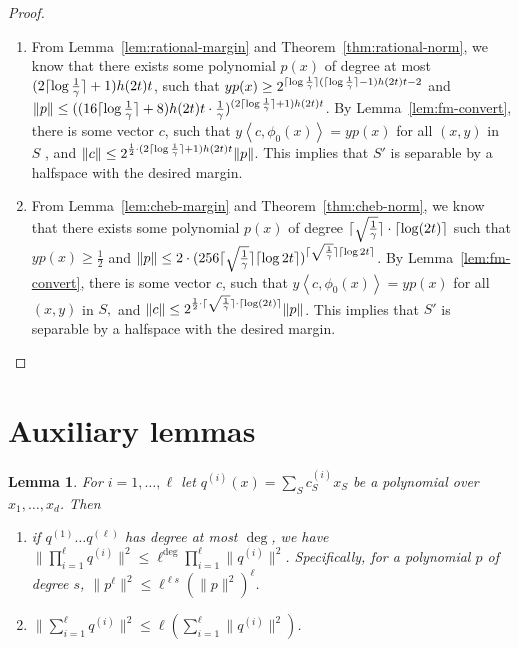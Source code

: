 \documentclass{article}
\DeclarePairedDelimiter\ceil{\lceil}{\rceil}
\newcommand{\inner}[1]{ \left\langle {#1} \right\rangle }
\newtheorem{lemma}[theorem]{Lemma}
\begin{document}
\begin{proof}
\begin{enumerate}
\item From Lemma~\ref{lem:rational-margin} and Theorem~\ref{thm:rational-norm}, 
we know that there exists some polynomial $p(x)$ of degree at most $(2\ceil{\log \frac 1 \gamma}+1) h(2t) t$, such that
$y p(x) \geq  2^{\ceil{\log \frac 1 \gamma}(\ceil{\log \frac 1 \gamma}-1)h(2t)t - 2}$ and 
$\|p\| \leq ((16\ceil{\log \frac 1 \gamma}+8) h(2t) t \cdot \frac 1 \gamma)^{(2\ceil{\log \frac 1 \gamma}+1)h(2t)t}$. 
By Lemma~\ref{lem:fm-convert}, there is some vector $c$, such that $y \inner{c, \phi_0(x)} = y p(x)$ for all $(x,y)$ in $S$	, and $\| c \| \leq 2^{\frac 1 2 \cdot (2\ceil{\log \frac 1 \gamma}+1) h(2t) t} \| p \|$.
This implies that $S'$ is separable by a halfspace with the desired margin.

\item From Lemma~\ref{lem:cheb-margin} and Theorem~\ref{thm:cheb-norm}, we know that there exists some polynomial $p(x)$ of degree $\ceil{\sqrt{\frac1\gamma}} \cdot \ceil{\log(2t)}$ such that
$y p(x) \geq \frac 1 2$ and
$\| p \| \leq 2 \cdot (256 \ceil{\sqrt{\frac1\gamma}} \ceil{\log 2t})^{\ceil{\sqrt{\frac1\gamma}} \ceil{\log 2t}}$. 
By Lemma~\ref{lem:fm-convert}, there is some vector $c$, such that $y \inner{c, \phi_0(x)} = y p(x)$ for all $(x,y)$ in $S,$ and $\| c \| \leq 2^{\frac 1 2 \cdot \ceil{\sqrt{\frac1\gamma}} \cdot \ceil{\log(2t)}} \| p \|$.	
This implies that $S'$ is separable by a halfspace with the desired margin.
\end{enumerate}


\end{proof}




\section{Auxiliary lemmas}
\begin{lemma}
   For $i=1,\ldots, \ell$ let $q^{(i)}(x)=\sum_S c^{(i)}_{S} x_S $ be a polynomial over $x_1, \ldots, x_d$. Then
   \begin{enumerate}
     \item if $q^{(1)}\ldots q^{(\ell)}$ has degree at most $\deg$, we have $\|\prod_{i=1}^{\ell} q^{(i)}\|^2 \leq \ell^{\deg} \prod_{i=1}^{\ell} \|q^{(i)}\|^2$. Specifically, for a polynomial $p$ of degree $s$, $\|p^\ell \|^2 \leq  \ell^{\ell s} (\|p\|^2)^\ell$.
     \item $\|\sum_{i=1}^{\ell} q^{(i)}\|^2 \leq \ell(\sum_{i=1}^{\ell} \|q^{(i)}\|^2)$.
   \end{enumerate}
   \label{lem:norm-oper}
\end{lemma}



\newpage


\end{document}
